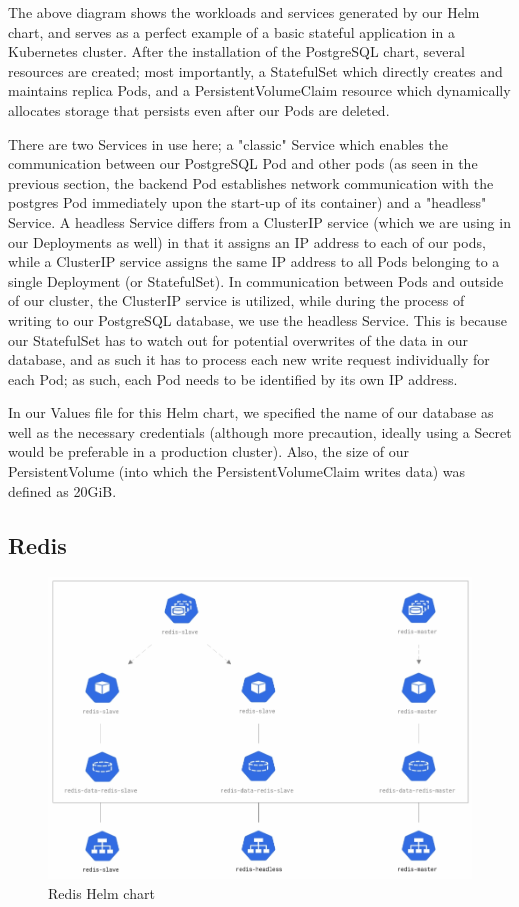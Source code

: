 \documentclass[thesis=B,english]{FITthesis}[2019/12/23]
\begin{document}
The above diagram shows the workloads and services generated by our Helm chart, and serves as a perfect example of a basic stateful application in a Kubernetes cluster. After the installation of the PostgreSQL chart, several resources are created; most importantly, a StatefulSet which directly creates and maintains replica Pods, and a PersistentVolumeClaim resource which dynamically allocates storage that persists even after our Pods are deleted.

\clearpage

There are two Services in use here; a "classic" Service which enables the communication between our PostgreSQL Pod and other pods (as seen in the previous section, the backend Pod establishes network communication with the postgres Pod immediately upon the start-up of its container) and a "headless" Service. A headless Service differs from a ClusterIP service (which we are using in our Deployments as well) in that it assigns an IP address to each of our pods, while a ClusterIP service assigns the same IP address to all Pods belonging to a single Deployment (or StatefulSet). \cite{kube-action} In communication between Pods and outside of our cluster, the ClusterIP service is utilized, while during the process of writing to our PostgreSQL database, we use the headless Service. This is because our StatefulSet has to watch out for potential overwrites of the data in our database, and as such it has to process each new write request individually for each Pod; as such, each Pod needs to be identified by its own IP address.

In our Values file for this Helm chart, we specified the name of our database as well as the necessary credentials (although more precaution, ideally using a Secret would be preferable in a production cluster). Also, the size of our PersistentVolume (into which the PersistentVolumeClaim writes data) was defined as 20GiB.

\subsection{Redis}

\begin{figure}[H]
\centering
\caption{Redis Helm chart}
\hspace*{-2.2cm}
\includegraphics[scale=0.5]{redis-diagram}
\end{figure}
\end{document}
